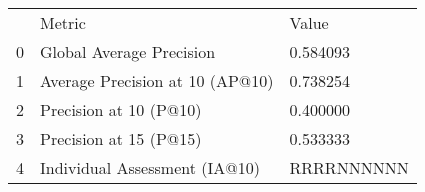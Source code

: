 \begin{tabular}{lll}
 & Metric & Value \\
0 & Global Average Precision & 0.584093 \\
1 & Average Precision at 10 (AP@10) & 0.738254 \\
2 & Precision at 10 (P@10) & 0.400000 \\
3 & Precision at 15 (P@15) & 0.533333 \\
4 & Individual Assessment (IA@10) & RRRRNNNNNN \\
\end{tabular}
